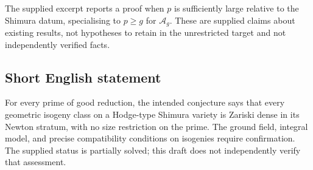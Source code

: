 \documentclass[11pt]{article}
\begin{document}
The supplied excerpt reports a proof when \(p\) is sufficiently large relative to the Shimura datum, specialising to \(p\geq g\) for \(\mathcal A_g\). These are supplied claims about existing results, not hypotheses to retain in the unrestricted target and not independently verified facts.
\subsection{Short English statement}
For every prime of good reduction, the intended conjecture says that every geometric isogeny class on a Hodge-type Shimura variety is Zariski dense in its Newton stratum, with no size restriction on the prime. The ground field, integral model, and precise compatibility conditions on isogenies require confirmation. The supplied status is partially solved; this draft does not independently verify that assessment.
\end{document}
